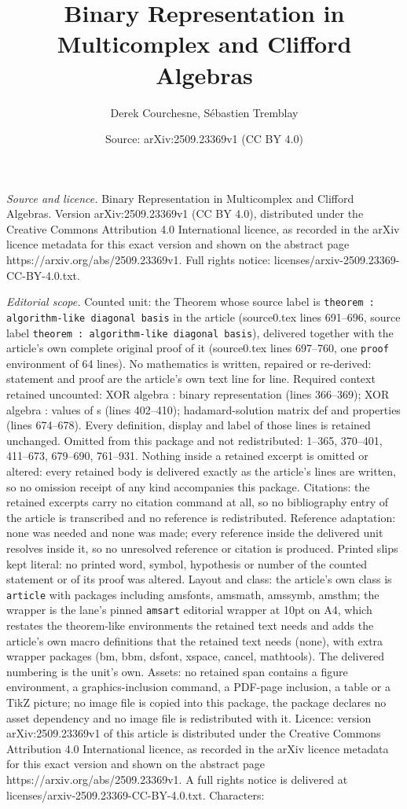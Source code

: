 \documentclass[10pt,a4paper]{amsart}
\title[Binary Representation in Multicomplex and Clifford Algebras]{Binary Representation in Multicomplex and Clifford Algebras}
\author{Derek Courchesne, S\'ebastien Tremblay}
\date{Source: arXiv:2509.23369v1 (CC BY 4.0)}
\begin{document}
\maketitle

\noindent\emph{Source and licence.} Binary Representation in Multicomplex and Clifford Algebras. Version arXiv:2509.23369v1 (CC BY 4.0), distributed under the Creative Commons Attribution 4.0 International licence, as recorded in the arXiv licence metadata for this exact version and shown on the abstract page https://arxiv.org/abs/2509.23369v1. Full rights notice: licenses/arxiv-2509.23369-CC-BY-4.0.txt.\par\smallskip

\noindent\textit{Editorial scope.} Counted unit: the Theorem whose source label is \texttt{theorem : algorithm-like diagonal basis} in the article (source0.tex lines 691--696, source label \texttt{theorem : algorithm-like diagonal basis}), delivered together with the article's own complete original proof of it (source0.tex lines 697--760, one \texttt{proof} environment of 64 lines). No mathematics is written, repaired or re-derived: statement and proof are the article's own text line for line. Required context retained uncounted: XOR algebra : binary representation (lines 366--369); XOR algebra : values of s (lines 402--410); hadamard-solution matrix def and properties (lines 674--678). Every definition, display and label of those lines is retained unchanged. Omitted from this package and not redistributed: 1--365, 370--401, 411--673, 679--690, 761--931. Nothing inside a retained excerpt is omitted or altered: every retained body is delivered exactly as the article's lines are written, so no omission receipt of any kind accompanies this package. Citations: the retained excerpts carry no citation command at all, so no bibliography entry of the article is transcribed and no reference is redistributed. Reference adaptation: none was needed and none was made; every reference inside the delivered unit resolves inside it, so no unresolved reference or citation is produced. Printed slips kept literal: no printed word, symbol, hypothesis or number of the counted statement or of its proof was altered. Layout and class: the article's own class is \texttt{article} with packages including amsfonts, amsmath, amssymb, amsthm; the wrapper is the lane's pinned \texttt{amsart} editorial wrapper at 10pt on A4, which restates the theorem-like environments the retained text needs and adds the article's own macro definitions that the retained text needs (none), with extra wrapper packages (bm, bbm, dsfont, xspace, cancel, mathtools). The delivered numbering is the unit's own. Assets: no retained span contains a figure environment, a graphics-inclusion command, a PDF-page inclusion, a table or a TikZ picture; no image file is copied into this package, the package declares no asset dependency and no image file is redistributed with it. Licence: version arXiv:2509.23369v1 of this article is distributed under the Creative Commons Attribution 4.0 International licence, as recorded in the arXiv licence metadata for this exact version and shown on the abstract page https://arxiv.org/abs/2509.23369v1. A full rights notice is delivered at licenses/arxiv-2509.23369-CC-BY-4.0.txt. Characters: 
\end{document}
